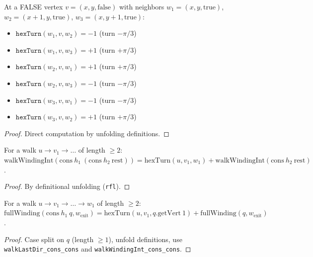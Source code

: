 \begin{lemma}
\begin{lemma}\label{lem:hex_turns_false}
\leanok
{}
  At a FALSE vertex $v = (x,y,\text{false})$ with neighbors
  $w_1 = (x,y,\text{true})$, $w_2 = (x{+}1,y,\text{true})$,
  $w_3 = (x,y{+}1,\text{true})$:
  \begin{itemize}
  \item $\texttt{hexTurn}(w_1, v, w_2) = -1$ (turn $-\pi/3$)
  \item $\texttt{hexTurn}(w_1, v, w_3) = +1$ (turn $+\pi/3$)
  \item $\texttt{hexTurn}(w_2, v, w_1) = +1$ (turn $+\pi/3$)
  \item $\texttt{hexTurn}(w_2, v, w_3) = -1$ (turn $-\pi/3$)
  \item $\texttt{hexTurn}(w_3, v, w_1) = -1$ (turn $-\pi/3$)
  \item $\texttt{hexTurn}(w_3, v, w_2) = +1$ (turn $+\pi/3$)
  \end{itemize}
\end{lemma}
\begin{proof}
\leanok
  Direct computation by unfolding definitions.
\end{proof}

\begin{lemma}\label{lem:winding_factor}
\leanok
{}
  For a walk $u \to v_1 \to \ldots$ of length $\geq 2$:
  $\mathrm{walkWindingInt}(\mathrm{cons}~h_1~(\mathrm{cons}~h_2~\mathrm{rest})) = \mathrm{hexTurn}(u, v_1, w_1) + \mathrm{walkWindingInt}(\mathrm{cons}~h_2~\mathrm{rest})$.
\end{lemma}
\begin{proof}\leanok By definitional unfolding (\texttt{rfl}).\end{proof}

\begin{lemma}\label{lem:full_winding_factor}
\leanok
{}
  For a walk $u \to v_1 \to \ldots \to w_1$ of length $\geq 2$:
  $\mathrm{fullWinding}(\mathrm{cons}~h_1~q, w_{\mathrm{exit}}) = \mathrm{hexTurn}(u, v_1, q.\mathrm{getVert}~1) + \mathrm{fullWinding}(q, w_{\mathrm{exit}})$.
\end{lemma}
\begin{proof}\leanok
  Case split on $q$ (length $\geq 1$), unfold definitions, use \texttt{walkLastDir\_cons\_cons}
  and \texttt{walkWindingInt\_cons\_cons}.
\end{proof}


\end{lemma}
